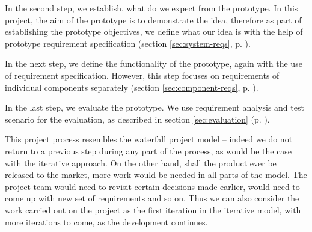 In the second step, we establish, what do we expect from the prototype. In this project, the aim of the prototype is to demonstrate the idea, therefore as part of establishing the prototype objectives, we define what our idea is with the help of prototype requirement specification (section \ref{sec:system-reqs}, p. \pageref{sec:system-reqs}). 

In the next step, we define the functionality of the prototype, again with the use of requirement specification. However, this step focuses on requirements of individual components separately (section \ref{sec:component-reqs}, p. \pageref{sec:component-reqs}).

In the last step, we evaluate the prototype. We use requirement analysis and test scenario for the evaluation, as described in section \ref{sec:evaluation} (p. \pageref{sec:evaluation}).

This project process resembles the waterfall project model -- indeed we do not return to a previous step during any part of the process, as would be the case with the iterative approach. On the other hand, shall the product ever be released to the market, more work would be needed in all parts of the model. The project team would need to revisit certain decisions made earlier, would need to come up with new set of requirements and so on. Thus we can also consider the work carried out on the project as the first iteration in the iterative model, with more iterations to come, as the development continues.